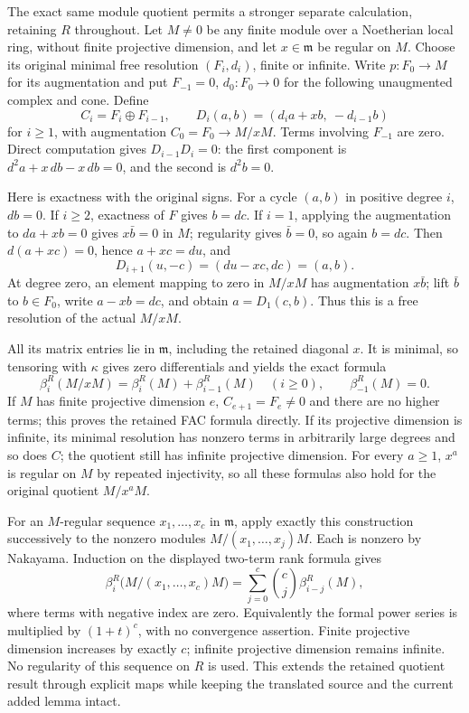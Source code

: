 The exact same module quotient permits a stronger separate calculation, retaining \(R\) throughout. Let \(M\ne0\) be any finite module over a Noetherian local ring, without finite projective dimension, and let \(x\in\mathfrak m\) be regular on \(M\). Choose its original minimal free resolution \((F_i,d_i)\), finite or infinite. Write \(p:F_0\to M\) for its augmentation and put \(F_{-1}=0\), \(d_0:F_0\to0\) for the following unaugmented complex and cone. Define \[
C_i=F_i\oplus F_{i-1},\qquad
D_i(a,b)=(d_i a+x b,\ -d_{i-1}b)
\] for \(i\ge1\), with augmentation \(C_0=F_0\to M/xM\). Terms involving \(F_{-1}\) are zero. Direct computation gives \(D_{i-1}D_i=0\): the first component is \(d^2a+x\,db-x\,db=0\), and the second is \(d^2b=0\).

Here is exactness with the original signs. For a cycle \((a,b)\) in positive degree \(i\), \(db=0\). If \(i\ge2\), exactness of \(F\) gives \(b=dc\). If \(i=1\), applying the augmentation to \(da+xb=0\) gives \(x\bar b=0\) in \(M\); regularity gives \(\bar b=0\), so again \(b=dc\). Then \(d(a+xc)=0\), hence \(a+xc=du\), and \[
D_{i+1}(u,-c)=(du-xc,dc)=(a,b).
\] At degree zero, an element mapping to zero in \(M/xM\) has augmentation \(x\bar b\); lift \(\bar b\) to \(b\in F_0\), write \(a-xb=dc\), and obtain \(a=D_1(c,b)\). Thus this is a free resolution of the actual \(M/xM\).

All its matrix entries lie in \(\mathfrak m\), including the retained diagonal \(x\). It is minimal, so tensoring with \(\kappa\) gives zero differentials and yields the exact formula \[
\beta_i^R(M/xM)=\beta_i^R(M)+\beta_{i-1}^R(M)
\quad(i\ge0),\qquad \beta_{-1}^R(M)=0 .
\] If \(M\) has finite projective dimension \(e\), \(C_{e+1}=F_e\ne0\) and there are no higher terms; this proves the retained FAC formula directly. If its projective dimension is infinite, its minimal resolution has nonzero terms in arbitrarily large degrees and so does \(C\); the quotient still has infinite projective dimension. For every \(a\ge1\), \(x^a\) is regular on \(M\) by repeated injectivity, so all these formulas also hold for the original quotient \(M/x^aM\).

For an \(M\)-regular sequence \(x_1,\ldots,x_c\) in \(\mathfrak m\), apply exactly this construction successively to the nonzero modules \(M/(x_1,\ldots,x_j)M\). Each is nonzero by Nakayama. Induction on the displayed two-term rank formula gives \[
\beta_i^R\bigl(M/(x_1,\ldots,x_c)M\bigr)
=\sum_{j=0}^c\binom cj\beta_{i-j}^R(M),
\] where terms with negative index are zero. Equivalently the formal power series is multiplied by \((1+t)^c\), with no convergence assertion. Finite projective dimension increases by exactly \(c\); infinite projective dimension remains infinite. No regularity of this sequence on \(R\) is used. This extends the retained quotient result through explicit maps while keeping the translated source and the current added lemma intact.

